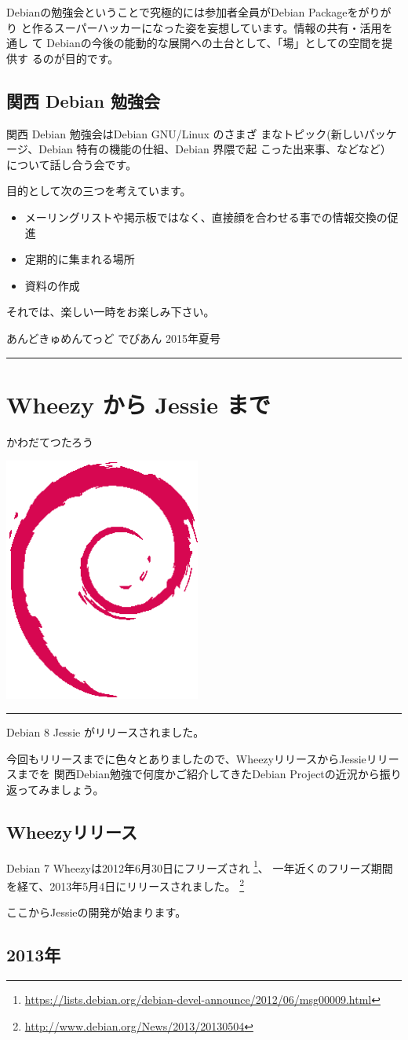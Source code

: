 \documentclass[mingoth,a4paper]{jsarticle}
\renewcommand{\dancersection}[2]{%
\newpage
あんどきゅめんてっど でびあん 2015年夏号
%
\vspace{0.1mm}\\
{\color{dancerdarkblue}\rule{\hsize}{2mm}}

%
%
\begin{minipage}[t]{0.6\hsize}
\color{dancerdarkblue}
\vspace{1cm}
\section{#1}
\hfill{}#2\\
\end{minipage}
\begin{minipage}[t]{0.4\hsize}
\vspace{-2cm}
\hfill{}\includegraphics[height=8cm]{image200502/openlogo-nd.eps}\\
\vspace{-5cm}
\end{minipage}
%
{\color{dancerlightblue}\rule{0.66\hsize}{2mm}}
%
\vspace{2cm}
}
\begin{document}
 Debianの勉強会ということで究極的には参加者全員がDebian Packageをがりがり
 と作るスーパーハッカーになった姿を妄想しています。情報の共有・活用を通し
 て Debianの今後の能動的な展開への土台として、「場」としての空間を提供す
 るのが目的です。

\subsection{関西 Debian 勉強会}

 関西 Debian 勉強会はDebian GNU/Linux のさまざ
 まなトピック(新しいパッケージ、Debian 特有の機能の仕組、Debian 界隈で起
 こった出来事、などなど）について話し合う会です。

 目的として次の三つを考えています。
 \begin{itemize}
  \item メーリングリストや掲示板ではなく、直接顔を合わせる事での情報交換の促進
  \item 定期的に集まれる場所
  \item 資料の作成
 \end{itemize}

 それでは、楽しい一時をお楽しみ下さい。


\clearpage
\newpage
\dancersection{Wheezy から Jessie まで}{かわだてつたろう}

Debian 8 Jessie がリリースされました。

今回もリリースまでに色々とありましたので、WheezyリリースからJessieリリースまでを
関西Debian勉強で何度かご紹介してきたDebian Projectの近況から振り返ってみましょう。

\subsection{Wheezyリリース}

Debian 7 Wheezyは2012年6月30日にフリーズされ
\footnote{\url{https://lists.debian.org/debian-devel-announce/2012/06/msg00009.html}}、
一年近くのフリーズ期間を経て、2013年5月4日にリリースされました。
\footnote{\url{http://www.debian.org/News/2013/20130504}}

ここからJessieの開発が始まります。


\subsection{2013年}
\end{document}
